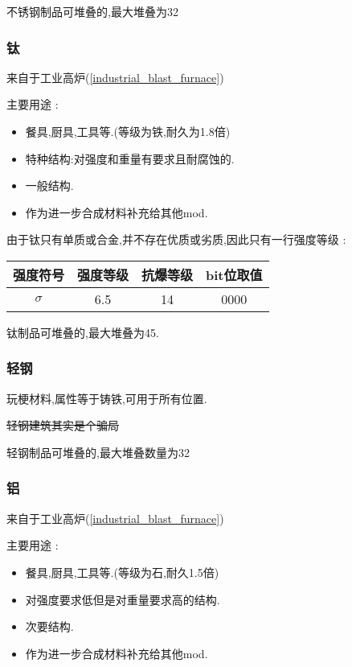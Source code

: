 {{{          不锈钢制品可堆叠的,最大堆叠为32
      }

      \subsubsection{钛}{
          来自于工业高炉({\ref{industrial_blast_furnace}})

          主要用途 :
          \begin{itemize}[itemsep=1pt]
              \item 餐具,厨具,工具等.(等级为铁,耐久为1.8倍)
              \item 特种结构:对强度和重量有要求且耐腐蚀的.
              \item 一般结构.
              \item 作为进一步合成材料补充给其他mod.
          \end{itemize}

          由于钛只有单质或合金,并不存在优质或劣质,因此只有一行强度等级 :
          \begin{center}
              \begin{tabular}{|c|c|c|c|}
                  \hline
                  强度符号 & 强度等级 & 抗爆等级 & bit位取值 \\
                  \hline
                  $\sigma$ & 6.5      & 14       & 0000      \\
                  \hline
              \end{tabular}
          \end{center}

          钛制品可堆叠的,最大堆叠为45.
      }

      \subsubsection{轻钢}{
          玩梗材料,属性等于铸铁,可用于所有位置.

          \sout{轻钢建筑其实是个骗局}

          轻钢制品可堆叠的,最大堆叠数量为32
      }

      \subsubsection{铝}{
          来自于工业高炉({\ref{industrial_blast_furnace}})

          主要用途 :
          \begin{itemize}[itemsep=1pt]
              \item 餐具,厨具,工具等.(等级为石,耐久1.5倍)
              \item 对强度要求低但是对重量要求高的结构.
              \item 次要结构.
              \item 作为进一步合成材料补充给其他mod.
          \end{itemize}

}}}
